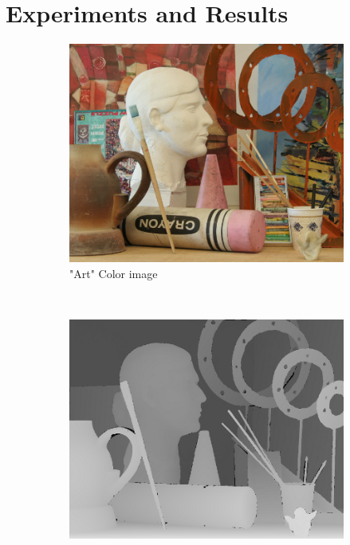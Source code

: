 \documentclass[letterpaper, 10 pt, conference]{ieeeconf}  %
\begin{document}
\section{Experiments and Results}
\begin{figure}[t]
        \centering
        \begin{subfigure}[b]{0.3\textwidth}
                \centering
                \includegraphics[width=\textwidth]{imgs/l4.png}
                \caption{"Art" Color image}
                \label{fig:trees}
        \end{subfigure}%
                ~ %
        \begin{subfigure}[b]{0.3\textwidth}
                \centering
                \includegraphics[width=\textwidth]{imgs/disp4.png}

\end{subfigure}
\end{figure}
\end{document}
